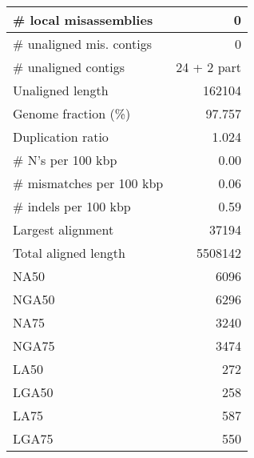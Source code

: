\documentclass[12pt,a4paper]{article}
\begin{document}
\begin{table}[ht]
\begin{center}
\begin{tabular}{|l*{1}{|r}|}
\# local misassemblies & 0 \\ \hline
\# unaligned mis. contigs & 0 \\ \hline
\# unaligned contigs & 24 + 2 part \\ \hline
Unaligned length & 162104 \\ \hline
Genome fraction (\%) & 97.757 \\ \hline
Duplication ratio & 1.024 \\ \hline
\# N's per 100 kbp & 0.00 \\ \hline
\# mismatches per 100 kbp & 0.06 \\ \hline
\# indels per 100 kbp & 0.59 \\ \hline
Largest alignment & 37194 \\ \hline
Total aligned length & 5508142 \\ \hline
NA50 & 6096 \\ \hline
NGA50 & 6296 \\ \hline
NA75 & 3240 \\ \hline
NGA75 & 3474 \\ \hline
LA50 & 272 \\ \hline
LGA50 & 258 \\ \hline
LA75 & 587 \\ \hline
LGA75 & 550 \\ \hline
\end{tabular}
\end{center}
\end{table}
\end{document}

